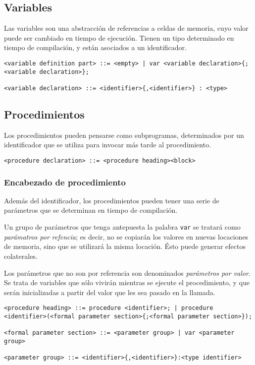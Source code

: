\documentclass[a4paper,oneside]{report}
\begin{document}
\subsection{Variables}

Las variables son una abstracción de referencias a celdas de memoria, cuyo valor puede ser cambiado en tiempo de ejecución. Tienen un tipo determinado en tiempo de compilación, y están asociados a un identificador.

\begin{verbatim}
<variable definition part> ::= <empty> | var <variable declaration>{;<variable declaration>};

<variable declaration> ::= <identifier>{,<identifier>} : <type>
\end{verbatim}

\subsection{Procedimientos}

Los procedimientos pueden pensarse como subprogramas, determinados por un identificador que se utiliza para invocar más tarde al procedimiento.

\begin{verbatim}
<procedure declaration> ::= <procedure heading><block>
\end{verbatim}

\subsubsection{Encabezado de procedimiento}

Además del identificador, los procedimientos pueden tener una serie de parámetros que se determinan en tiempo de compilación.

Un grupo de parámetros que tenga antepuesta la palabra \texttt{var} se tratará como \textit{parámatros por refencia}; es decir, no se copiarán los valores en nuevas locaciones de memoria, sino que se utilizará la misma locación. Ésto puede generar efectos colaterales.

Los parámetros que no son por referencia son denominados \textit{parámetros por valor}. Se trata de variables que sólo vivirán mientras se ejecute el procedimiento, y que serán inicializadas a partir del valor que les sea pasado en la llamada.

\begin{verbatim}
<procedure heading> ::= procedure <identifier>; | procedure <identifier>(<formal parameter section>{;<formal parameter section>});

<formal parameter section> ::= <parameter group> | var <parameter group>

<parameter group> ::= <identifier>{,<identifier>}:<type identifier>
\end{verbatim}
\end{document}
